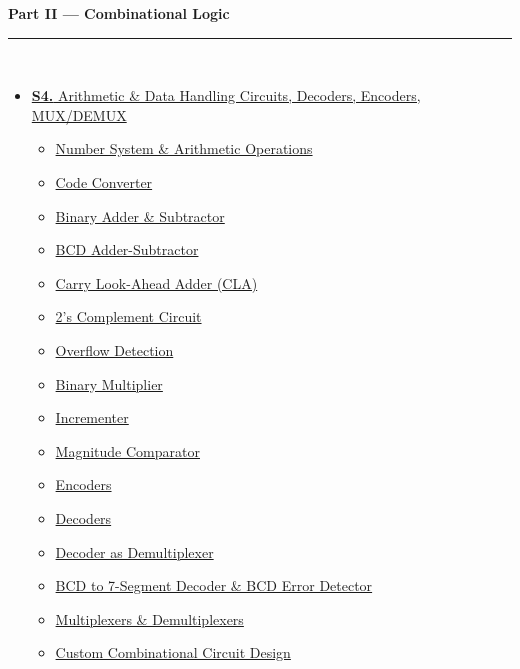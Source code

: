 \documentclass[12pt]{article}
\begin{document}
\begin{tcolorbox}[breakable,colback=cB!5,colframe=cB,boxrule=1pt,arc=5pt,
  left=8pt,right=8pt,top=8pt,bottom=8pt,before skip=4pt]
  {\large\bfseries\textcolor{cB}{Part II --- Combinational Logic}}\\[5pt]
  \textcolor{cB!40}{\rule{\textwidth}{0.4pt}}\\[3pt]
  \small\begin{itemize}[leftmargin=1.2em,itemsep=1pt,label={\textcolor{cB}{$\triangleright$}}]
    \item \hyperref[sec:S4]{\textbf{S4.} Arithmetic \& Data Handling Circuits, Decoders, Encoders, MUX/DEMUX}
      \begin{itemize}[leftmargin=1.5em,itemsep=0pt,label={\textcolor{cB}{$\cdot$}}]
        \item \hyperref[sub:s4-number-sys]{Number System \& Arithmetic Operations}
        \item \hyperref[sub:s4-code-converter]{Code Converter}
        \item \hyperref[sub:s4-adder-sub]{Binary Adder \& Subtractor}
        \item \hyperref[sub:s4-bcd-addsub]{BCD Adder-Subtractor}
        \item \hyperref[sub:s4-cla]{Carry Look-Ahead Adder (CLA)}
        \item \hyperref[sub:s4-2scomp]{2's Complement Circuit}
        \item \hyperref[sub:s4-overflow]{Overflow Detection}
        \item \hyperref[sub:s4-multiplier]{Binary Multiplier}
        \item \hyperref[sub:s4-incrementer]{Incrementer}
        \item \hyperref[sub:s4-comparator]{Magnitude Comparator}
        \item \hyperref[sub:s4-encoders]{Encoders}
        \item \hyperref[sub:s4-decoder-func]{Decoders}
        \item \hyperref[sub:s4-demux]{Decoder as Demultiplexer}
        \item \hyperref[sub:s4-bcd]{BCD to 7-Segment Decoder \& BCD Error Detector}
        \item \hyperref[sub:s4-mux]{Multiplexers \& Demultiplexers}
        \item \hyperref[sub:s4-comb-custom]{Custom Combinational Circuit Design}
      \end{itemize}
  \end{itemize}
\end{tcolorbox}
\end{document}
